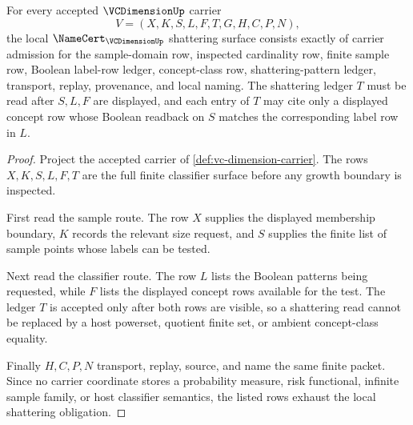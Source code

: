 \begin{theorem}
\label{thm:vc-dimension-shattering-obligation}
For every accepted $\VCDimensionUp$ carrier
$$
V=(X,K,S,L,F,T,G,H,C,P,N),
$$
the local $\NameCert_{\VCDimensionUp}$ shattering surface consists exactly of
carrier admission for the sample-domain row, inspected cardinality row,
finite sample row, Boolean label-row ledger, concept-class row,
shattering-pattern ledger, transport, replay, provenance, and local naming.
The shattering ledger $T$ must be read after $S,L,F$ are displayed, and each
entry of $T$ may cite only a displayed concept row whose Boolean readback on
$S$ matches the corresponding label row in $L$.
\end{theorem}
\begin{proof}
Project the accepted carrier of \autoref{def:vc-dimension-carrier}. The rows
$X,K,S,L,F,T$ are the full finite classifier surface before any growth
boundary is inspected.

First read the sample route. The row $X$ supplies the displayed membership
boundary, $K$ records the relevant size request, and $S$ supplies the finite
list of sample points whose labels can be tested.

Next read the classifier route. The row $L$ lists the Boolean patterns being
requested, while $F$ lists the displayed concept rows available for the test.
The ledger $T$ is accepted only after both rows are visible, so a shattering
read cannot be replaced by a host powerset, quotient finite set, or ambient
concept-class equality.

Finally $H,C,P,N$ transport, replay, source, and name the same finite packet.
Since no carrier coordinate stores a probability measure, risk functional,
infinite sample family, or host classifier semantics, the listed rows exhaust
the local shattering obligation.
\end{proof}

